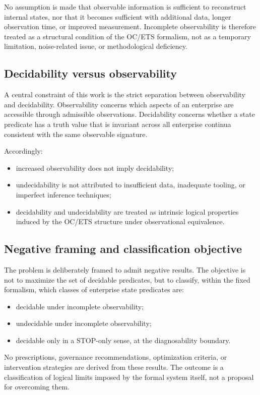 No assumption is made that observable information is sufficient to
reconstruct internal states, nor that it becomes sufficient with
additional data, longer observation time, or improved measurement.
Incomplete observability is therefore treated as a structural condition
of the OC/ETS formalism, not as a temporary limitation, noise-related
issue, or methodological deficiency.

\subsection{Decidability versus observability}
\label{subsec:decidability-vs-observability}

A central constraint of this work is the strict separation between
observability and decidability. Observability concerns which aspects of
an enterprise are accessible through admissible observations.
Decidability concerns whether a state predicate has a truth value that
is invariant across all enterprise continua consistent with the same
observable signature.

Accordingly:
\begin{itemize}
\item increased observability does not imply decidability;
\item undecidability is not attributed to insufficient data, inadequate
      tooling, or imperfect inference techniques;
\item decidability and undecidability are treated as intrinsic logical
      properties induced by the OC/ETS structure under observational
      equivalence.
\end{itemize}

\subsection{Negative framing and classification objective}
\label{subsec:negative-framing}

The problem is deliberately framed to admit negative results. The
objective is not to maximize the set of decidable predicates, but to
classify, within the fixed formalism, which classes of enterprise state
predicates are:
\begin{itemize}
\item decidable under incomplete observability;
\item undecidable under incomplete observability;
\item decidable only in a STOP-only sense, at the diagnosability boundary.
\end{itemize}

No prescriptions, governance recommendations, optimization criteria, or
intervention strategies are derived from these results. The outcome is a
classification of logical limits imposed by the formal system itself,
not a proposal for overcoming them.

